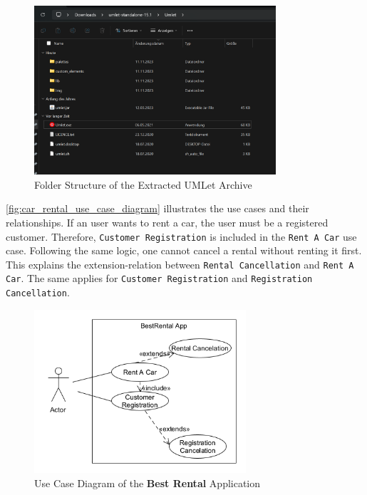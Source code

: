 \begin{figure}
    \centering
    \includegraphics[width=0.8\textwidth]{figures/goLang/carRental/carRental_umletInstallation.png}
    \caption{Folder Structure of the Extracted UMLet Archive}
    \label{fig:umlet_folder_structure}
\end{figure}

\autoref{fig:car_rental_use_case_diagram} illustrates the use cases and their relationships.
If an user wants to rent a car, the user must be a registered customer.
Therefore, \texttt{Customer Registration} is included in the \texttt{Rent A Car} use case.
Following the same logic, one cannot cancel a rental without renting it first.
This explains the extension-relation between \texttt{Rental Cancellation} and \texttt{Rent A Car}.
The same applies for \texttt{Customer Registration} and \texttt{Registration Cancellation}.

\begin{figure}
    \centering
    \includegraphics[width=0.7\textwidth]{figures/goLang/carRental/carRental_umlDiagram.png}
    \caption{Use Case Diagram of the \textbf{Best Rental} Application}
    \label{fig:car_rental_use_case_diagram}
\end{figure}

